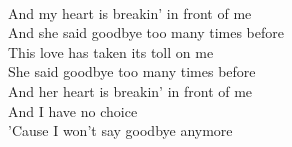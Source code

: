 \\
And my heart is breakin' in front of me \\
And she said goodbye too many times before \\
This love has taken its toll on me \\
She said goodbye too many times before \\
And her heart is breakin' in front of me \\
And I have no choice \\
'Cause I won't say goodbye anymore \\

